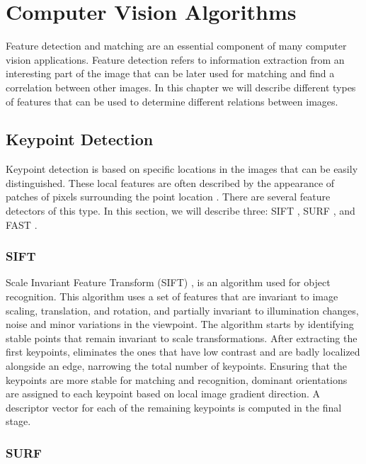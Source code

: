 \section{Computer Vision Algorithms}

Feature detection and matching are an essential component of many computer vision applications. Feature detection refers to information extraction from an interesting part of the image that can be later used for matching and find a correlation between other images. In this chapter we will describe different types of features that can be used to determine different relations between images.

\subsection{Keypoint Detection}
\label{sub:keypoint}

Keypoint detection is based on specific locations in the images that can be easily distinguished. These local features are often described by the appearance of patches of pixels surrounding the point location \cite{szeliski2011computer}.
There are several feature detectors of this type. In this section, we will describe three: SIFT \cite{lowe1999object}, SURF \cite{bay2006surf}, and FAST \cite{rosten2006machine}.

\subsubsection{SIFT}
\label{subsub:sift}
Scale Invariant Feature Transform (SIFT) \cite{lowe1999object}, is an algorithm used for object recognition. This algorithm uses a set of features that are invariant to image scaling, translation, and rotation, and partially invariant to illumination changes, noise and minor variations in the viewpoint.
The algorithm starts by identifying stable points that remain invariant to scale transformations. After extracting the first keypoints, eliminates the ones that have low contrast and are badly localized alongside an edge, narrowing the total number of keypoints. Ensuring that the keypoints are more stable for matching and recognition, dominant orientations are assigned to each keypoint based on local image gradient direction. A descriptor vector for each of the remaining keypoints is computed in the final stage.

\subsubsection{SURF}
\label{subsub:surf}

